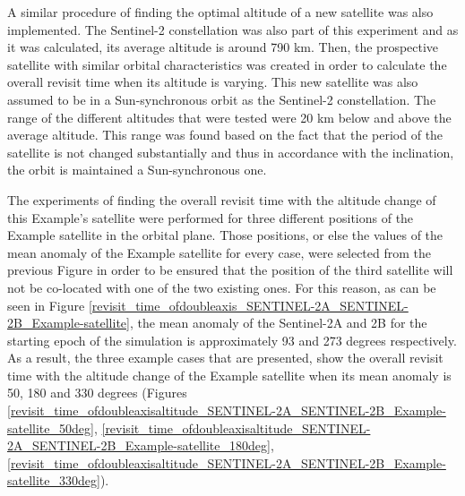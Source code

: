 

A similar procedure of finding the optimal altitude of a new satellite was also implemented. The Sentinel-2 constellation was also part of this experiment and as it was calculated, its average altitude is around 790 km. Then, the prospective satellite with similar orbital characteristics was created in order to calculate the overall revisit time when its altitude is varying. This new satellite was also assumed to be in a Sun-synchronous orbit as the Sentinel-2 constellation. The range of the different altitudes that were tested were 20 km below and above the average altitude. This range was found based on the fact that the period of the satellite is not changed substantially and thus in accordance with the inclination, the orbit is maintained a Sun-synchronous one.

The experiments of finding the overall revisit time with the altitude change of this Example's satellite were performed for three different positions of the Example satellite in the orbital plane. Those positions, or else the values of the mean anomaly of the Example satellite for every case, were selected from the previous Figure in order to be ensured that the position of the third satellite will not be co-located with one of the two existing ones. For this reason, as can be seen in Figure \ref{revisit_time_ofdoubleaxis_SENTINEL-2A_SENTINEL-2B_Example-satellite}, the mean anomaly of the Sentinel-2A and 2B for the starting epoch of the simulation is approximately 93 and 273 degrees respectively. As a result, the three example cases that are presented, show the overall revisit time with the altitude change of the Example satellite when its mean anomaly is 50, 180 and 330 degrees (Figures \ref{revisit_time_ofdoubleaxisaltitude_SENTINEL-2A_SENTINEL-2B_Example-satellite_50deg}, \ref{revisit_time_ofdoubleaxisaltitude_SENTINEL-2A_SENTINEL-2B_Example-satellite_180deg}, \ref{revisit_time_ofdoubleaxisaltitude_SENTINEL-2A_SENTINEL-2B_Example-satellite_330deg}).

